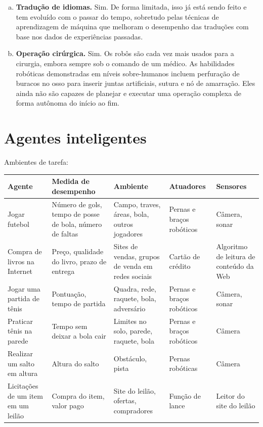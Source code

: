 \begin{solution}
\begin{enumerate} [a.]
	\item \textbf{Tradução de idiomas.} Sim. De forma limitada, isso já está sendo feito e tem evoluído com o passar do tempo, sobretudo pelas técnicas de aprendizagem de máquina que melhoram o desempenho das traduções com base nos dados de experiências passadas.
	
	\item \textbf{Operação cirúrgica.} Sim. Os robôs são cada vez mais usados para a cirurgia, embora sempre sob o comando de um médico. As habilidades robóticas demonstradas em níveis sobre-humanos incluem perfuração de buracos no osso para inserir juntas artificiais, sutura e nó de amarração. Eles ainda não são capazes de planejar e executar uma operação complexa de forma autônoma do início ao fim.
\end{enumerate}
\end{solution}

\clearpage

\section{Agentes inteligentes}
\resetsolutionnumbering

\begin{solution}
Ambientes de tarefa:
\begin{table}[h]
	\centering
	\small
	\begin{tabular}{L{2cm} L{3cm} L{3cm} L{2.9cm} L{2.9cm}}
		\hline
		\color{white}\textbf{Agente} & \color{white}\textbf{Medida de desempenho} & \color{white}\textbf{Ambiente} & \color{white}\textbf{Atuadores} & \color{white}\textbf{Sensores} \\
		\hline
		Jogar futebol & Número de gols, tempo de posse de bola, número de faltas & Campo, traves, áreas, bola, outros jogadores & Pernas e braços robóticos & Câmera, sonar \\
		Compra de livros na Internet & Preço, qualidade do livro, prazo de entrega & Sites de vendas, grupos de venda em redes sociais & Cartão de crédito & Algoritmo de leitura de conteúdo da Web \\
		Jogar uma partida de tênis & Pontuação, tempo de partida & Quadra, rede, raquete, bola, adversário & Pernas e braços robóticos & Câmera, sonar \\
		Praticar tênis na parede & Tempo sem deixar a bola cair & Limites no solo, parede, raquete, bola & Pernas e braços robóticos & Câmera \\
		Realizar um salto em altura & Altura do salto & Obstáculo, pista & Pernas robóticas & Câmera \\
		Licitações de um item em um leilão & Compra do item, valor pago & Site do leilão, ofertas, compradores & Função de lance & Leitor do site do leilão \\
		\hline
	\end{tabular}
\end{table}
\end{solution}

